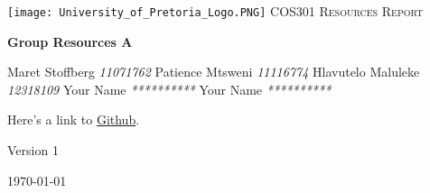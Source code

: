 
\begin{titlepage}
\begin{center}
\texttt{[image: University\_of\_Pretoria\_Logo.PNG]}\newline
\textsc{\LARGE COS301 Resources Report}\newline


\textbf{Group Resources A} \\
\begin{flushright} \large
Maret Stoffberg \emph{11071762} \newline
Patience Mtsweni \emph{11116774} \newline
Hlavutelo Maluleke \emph{12318109} \newline
Your Name \emph{**********} \newline
Your Name \emph{**********} \newline \newline \newline
\end{flushright}
Here's a link to \href{https://github.com/MaretStoffberg/COS301_phase3_ResourcesA}{Github}.


\vfill

{\large Version 1}

{\large \today}

\end{center}
\end{titlepage}
